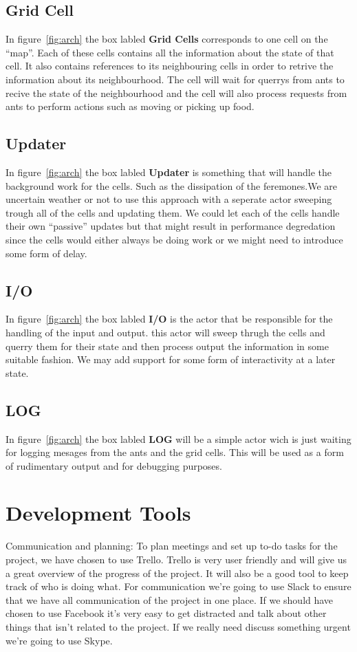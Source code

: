 \documentclass[a4paper]{article}
\begin{document}
\subsection{Grid Cell}
In figure~\ref{fig:arch} the box labled \textbf{Grid Cells} corresponds to one
cell on the ``map''. Each of these cells contains all the information about the state of
that cell. It also contains references to its neighbouring cells in order to
retrive the information about its neighbourhood. The cell will wait for querrys
from ants to recive the state of the neighbourhood and the cell will also
process requests from ants to perform actions such as moving or picking up food.

\subsection{Updater}
In figure~\ref{fig:arch} the box labled \textbf{Updater} is something that will
handle the background work for the cells. Such as the dissipation of the feremones.We
are uncertain weather or not to use this approach with a seperate actor sweeping
trough all of the cells and updating them. We could let each of the cells handle
their own ``passive'' updates but that might result in performance degredation
since the cells would either always be doing work or we might need to introduce
some form of delay.

\subsection{I/O}
In figure~\ref{fig:arch} the box labled \textbf{I/O} is the actor that be
responsible for the handling of the input and output. this actor will sweep thrugh the cells and
querry them for their state and then process output the information in some
suitable fashion. We may add support for some form of interactivity at a later
state.

\subsection{LOG}
In figure~\ref{fig:arch} the box labled \textbf{LOG} will be a simple actor wich
is just waiting for logging mesages from the ants and the grid cells. This will be
used as a form of rudimentary output and for debugging purposes.


\section{Development Tools}
Communication and planning: To plan meetings and set up to-do tasks for the
project, we have chosen to use Trello. Trello is very user friendly and will
give us a great overview of the progress of the project. It will also be a good
tool to keep track of who is doing what. For communication we’re going to use
Slack to ensure that we have all communication of the project in one place. If
we should have chosen to use Facebook it’s very easy to get distracted and talk
about other things that isn’t related to the project. If we really need discuss
something urgent we’re going to use Skype.
\end{document}
